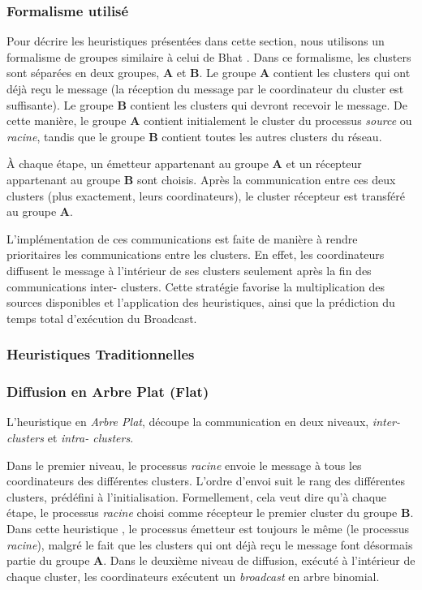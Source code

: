\subsubsection*{Formalisme utilisé}

Pour décrire les heuristiques présentées dans cette section, nous
utilisons un formalisme de groupes similaire à celui de Bhat \cite{Bhat03}.
Dans ce formalisme, les  clusters sont séparées en deux groupes, \textbf{A}
et \textbf{B}. Le groupe \textbf{A} contient les  clusters qui ont déjà
reçu le message (la réception du message par le coordinateur du
 cluster est suffisante). Le groupe \textbf{B} contient les  clusters
qui devront recevoir le message. De cette manière, le groupe \textbf{A}
contient initialement le  cluster du processus \emph{source} ou \emph{racine},
tandis que le groupe \textbf{B} contient toutes les autres  clusters
du réseau.

À chaque étape, un émetteur appartenant au groupe \textbf{A} et un
récepteur appartenant au groupe \textbf{B} sont choisis. Après la
communication entre ces deux  clusters (plus exactement, leurs coordinateurs),
le cluster récepteur est transféré au groupe \textbf{A}. 

L'implémentation de ces communications est faite de manière à rendre
prioritaires les communications entre les  clusters. En effet, les coordinateurs
diffusent le message à l'intérieur de ses  clusters seulement après
la fin des communications inter- clusters. Cette stratégie favorise
la multiplication des sources disponibles et l'application des heuristiques,
ainsi que la prédiction du temps total d'exécution du Broadcast.

\subsubsection{Heuristiques Traditionnelles}

\subsubsection*{Diffusion en Arbre Plat (Flat)}

L'heuristique en \emph{Arbre Plat}, découpe la communication en deux niveaux, \emph{inter- clusters}
et \emph{intra- clusters}. 

Dans le premier niveau, le processus \emph{racine} envoie le message
à tous les coordinateurs des différentes  clusters. L'ordre d'envoi
suit le \og rang \fg{} des différentes  clusters, prédéfini à l'initialisation.
Formellement, cela veut dire qu'à chaque étape, le processus \emph{racine}
choisi comme récepteur le premier  cluster du groupe \textbf{B}. Dans
cette \og heuristique \fg{}, le processus émetteur est toujours
le même (le processus \emph{racine}), malgré le fait que les  clusters
qui ont déjà reçu le message font désormais partie du groupe \textbf{A}.
Dans le deuxième niveau de diffusion, exécuté à l'intérieur de chaque
 cluster, les coordinateurs exécutent un \emph{broadcast} en arbre binomial.

